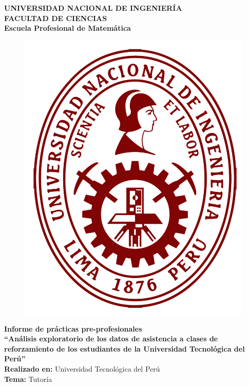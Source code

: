 \documentclass[11pt,a4paper]{book}
\theoremstyle{definition}%
\begin{document}
    \renewcommand{\listtablename}{Índice de tablas}
    \renewcommand{\tablename}{Tabla}
    \thispagestyle{empty}
    \addtocounter{page}{-1}
    \begin{center}
        {\huge \textbf{UNIVERSIDAD NACIONAL DE INGENIERÍA}}\\
    \vspace{0.5cm}
        {\huge \textbf{FACULTAD DE CIENCIAS}}\\
    \vspace{0.25cm}
    {\huge \textbf{Escuela Profesional de Matemática}}\\
    \vspace{0.25cm}
        \begin{figure}[h!]
            \centering
            \includegraphics[scale=0.15]{bg/Uni-logo_transparente.png}
        \end{figure}
    \vspace{0.1cm}
         {\huge \textbf{Informe de prácticas pre-profesionales}}\\
    \vspace{1cm}
    {\huge \textbf{``Análisis exploratorio de los datos de asistencia a clases de reforzamiento de los estudiantes de la Universidad Tecnológica del Perú''}}\\
    \vspace{1cm}
        \LARGE{\textbf{Realizado en: }Universidad Tecnológica del Perú}\\
        \LARGE{\textbf{Tema: }Tutoría}
    \end{center}
    \vspace{1cm}
    
\end{document}
